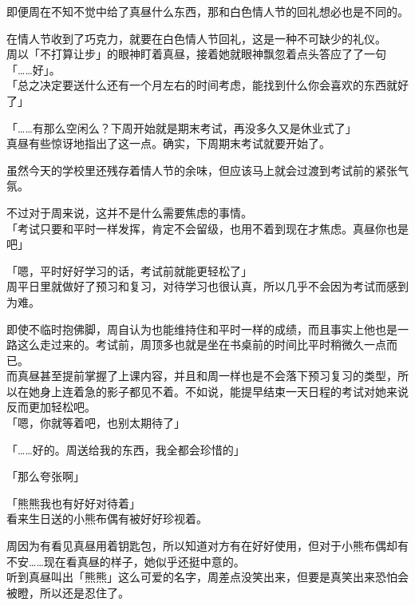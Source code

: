 即便周在不知不觉中给了真昼什么东西，那和白色情人节的回礼想必也是不同的。

在情人节收到了巧克力，就要在白色情人节回礼，这是一种不可缺少的礼仪。\\

周以「不打算让步」的眼神盯着真昼，接着她就眼神飘忽着点头答应了了一句「……好」。\\

「总之决定要送什么还有一个月左右的时间考虑，能找到什么你会喜欢的东西就好了」

「……有那么空闲么？下周开始就是期末考试，再没多久又是休业式了」\\

真昼有些惊讶地指出了这一点。确实，下周期末考试就要开始了。

虽然今天的学校里还残存着情人节的余味，但应该马上就会过渡到考试前的紧张气氛。

不过对于周来说，这并不是什么需要焦虑的事情。\\

「考试只要和平时一样发挥，肯定不会留级，也用不着到现在才焦虑。真昼你也是吧」

「嗯，平时好好学习的话，考试前就能更轻松了」\\

周平日里就做好了预习和复习，对待学习也很认真，所以几乎不会因为考试而感到为难。

即使不临时抱佛脚，周自认为也能维持住和平时一样的成绩，而且事实上他也是一路这么走过来的。考试前，周顶多也就是坐在书桌前的时间比平时稍微久一点而已。\\

而真昼甚至提前掌握了上课内容，并且和周一样也是不会落下预习复习的类型，所以在她身上连着急的影子都见不着。不如说，能提早结束一天日程的考试对她来说反而更加轻松吧。\\

「嗯，你就等着吧，也别太期待了」

「……好的。周送给我的东西，我全都会珍惜的」

「那么夸张啊」

「熊熊我也有好好对待着」\\

看来生日送的小熊布偶有被好好珍视着。

周因为有看见真昼用着钥匙包，所以知道对方有在好好使用，但对于小熊布偶却有不安……现在看真昼的样子，她似乎还挺中意的。\\

听到真昼叫出「熊熊」这么可爱的名字，周差点没笑出来，但要是真笑出来恐怕会被瞪，所以还是忍住了。\\

